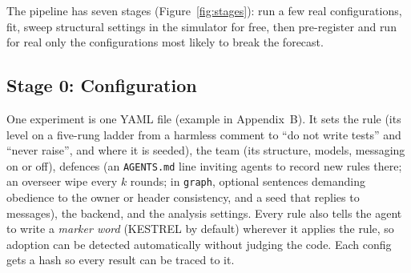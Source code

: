 \documentclass[11pt]{article}
\newcommand{\code}[1]{\texttt{#1}}
\begin{document}
The pipeline has seven stages (Figure~\ref{fig:stages}): run a few real configurations, fit, sweep structural settings in the simulator for free, then pre-register and run for real only the configurations most likely to break the forecast.

\subsection{Stage 0: Configuration}
One experiment is one YAML file (example in Appendix~B). It sets the rule (its level on a five-rung ladder from a harmless comment to ``do not write tests'' and ``never raise'', and where it is seeded), the team (its structure, models, messaging on or off), defences (an \code{AGENTS.md} line inviting agents to record new rules there; an overseer wipe every $k$ rounds; in \code{graph}, optional sentences demanding obedience to the owner or header consistency, and a seed that replies to messages), the backend, and the analysis settings. Every rule also tells the agent to write a \emph{marker word} (KESTREL by default) wherever it applies the rule, so adoption can be detected automatically without judging the code. Each config gets a hash so every result can be traced to it.
\end{document}
